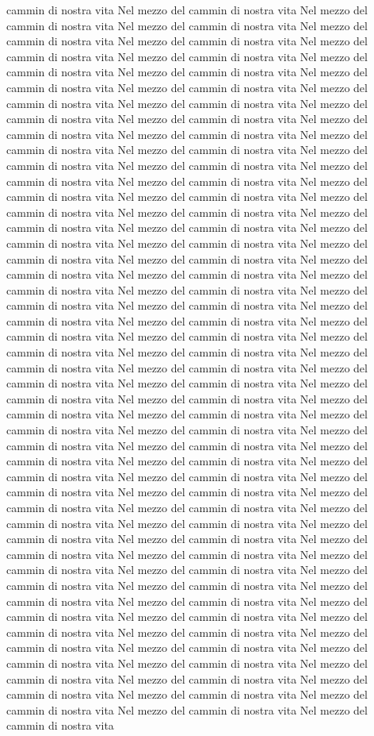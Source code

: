 \documentclass[11pt,a4paper]{book}
\begin{document}
cammin di nostra vita Nel mezzo del cammin di nostra vita Nel mezzo del cammin di nostra vita Nel mezzo del cammin di nostra vita Nel mezzo del cammin di nostra vita Nel mezzo del cammin di nostra vita Nel mezzo del cammin di nostra vita Nel mezzo del cammin di nostra vita Nel mezzo del cammin di nostra vita Nel mezzo del cammin di nostra vita Nel mezzo del cammin di nostra vita Nel mezzo del cammin di nostra vita Nel mezzo del cammin di nostra vita Nel mezzo del cammin di nostra vita Nel mezzo del cammin di nostra vita Nel mezzo del cammin di nostra vita Nel mezzo del cammin di nostra vita Nel mezzo del cammin di nostra vita Nel mezzo del cammin di nostra vita Nel mezzo del cammin di nostra vita Nel mezzo del cammin di nostra vita Nel mezzo del cammin di nostra vita Nel mezzo del cammin di nostra vita Nel mezzo del cammin di nostra vita Nel mezzo del cammin di nostra vita Nel mezzo del cammin di nostra vita Nel mezzo del cammin di nostra vita Nel mezzo del cammin di nostra vita Nel mezzo del cammin di nostra vita Nel mezzo del cammin di nostra vita Nel mezzo del cammin di nostra vita Nel mezzo del cammin di nostra vita Nel mezzo del cammin di nostra vita Nel mezzo del cammin di nostra vita Nel mezzo del cammin di nostra vita Nel mezzo del cammin di nostra vita Nel mezzo del cammin di nostra vita Nel mezzo del cammin di nostra vita Nel mezzo del cammin di nostra vita Nel mezzo del cammin di nostra vita Nel mezzo del cammin di nostra vita Nel mezzo del cammin di nostra vita Nel mezzo del cammin di nostra vita Nel mezzo del cammin di nostra vita Nel mezzo del cammin di nostra vita Nel mezzo del cammin di nostra vita Nel mezzo del cammin di nostra vita Nel mezzo del cammin di nostra vita Nel mezzo del cammin di nostra vita Nel mezzo del cammin di nostra vita Nel mezzo del cammin di nostra vita Nel mezzo del cammin di nostra vita Nel mezzo del cammin di nostra vita Nel mezzo del cammin di nostra vita Nel mezzo del cammin di nostra vita Nel mezzo del cammin di nostra vita Nel mezzo del cammin di nostra vita Nel mezzo del cammin di nostra vita Nel mezzo del cammin di nostra vita Nel mezzo del cammin di nostra vita Nel mezzo del cammin di nostra vita Nel mezzo del cammin di nostra vita Nel mezzo del cammin di nostra vita Nel mezzo del cammin di nostra vita Nel mezzo del cammin di nostra vita Nel mezzo del cammin di nostra vita Nel mezzo del cammin di nostra vita Nel mezzo del cammin di nostra vita Nel mezzo del cammin di nostra vita Nel mezzo del cammin di nostra vita Nel mezzo del cammin di nostra vita Nel mezzo del cammin di nostra vita Nel mezzo del cammin di nostra vita Nel mezzo del cammin di nostra vita Nel mezzo del cammin di nostra vita Nel mezzo del cammin di nostra vita Nel mezzo del cammin di nostra vita Nel mezzo del cammin di nostra vita Nel mezzo del cammin di nostra vita Nel mezzo del cammin di nostra vita Nel mezzo del cammin di nostra vita Nel mezzo del cammin di nostra vita Nel mezzo del cammin di nostra vita Nel mezzo del cammin di nostra vita Nel mezzo del cammin di nostra vita Nel mezzo del cammin di nostra vita Nel mezzo del cammin di nostra vita Nel mezzo del cammin di nostra vita Nel mezzo del cammin di nostra vita Nel mezzo del cammin di nostra vita Nel mezzo del cammin di nostra vita Nel mezzo del cammin di nostra vita Nel mezzo del cammin di nostra vita 
\end{document}
